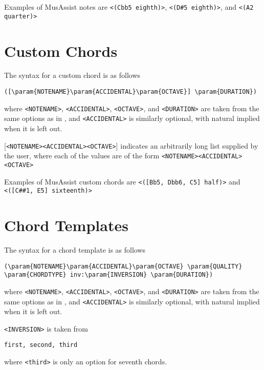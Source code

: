 \documentclass{report}
\newcommand\param[1]{\verb!<#1>!}
\begin{document}
Examples of MusAssist notes are \param{(Cbb5 eighth)}, \param{(D#5 eighth)}, and \param{(A2 quarter)}


\section{Custom Chords}
The syntax for a custom chord is as follows

\begin{verbatim}
([\param{NOTENAME}\param{ACCIDENTAL}\param{OCTAVE}] \param{DURATION})
\end{verbatim}

\noindent where \param{NOTENAME}, \param{ACCIDENTAL}, \param{OCTAVE}, and \param{DURATION} are taken from the same options as in , and \param{ACCIDENTAL} is similarly optional, with natural implied when it is left out.

[\param{NOTENAME}\param{ACCIDENTAL}\param{OCTAVE}] indicates an arbitrarily long list supplied by the user, where each of the values are of the form \param{NOTENAME}\param{ACCIDENTAL}\param{OCTAVE}

Examples of MusAssist custom chords are \param{([Bb5, Dbb6, C5] half)} and  \param{([C##1, E5] sixteenth)}


\section{Chord Templates}
The syntax for a chord template is as follows

\begin{verbatim}
(\param{NOTENAME}\param{ACCIDENTAL}\param{OCTAVE} \param{QUALITY} \param{CHORDTYPE} inv:\param{INVERSION} \param{DURATION})
\end{verbatim}

\noindent where \param{NOTENAME}, \param{ACCIDENTAL}, \param{OCTAVE}, and \param{DURATION} are taken from the same options as in , and \param{ACCIDENTAL} is similarly optional, with natural implied when it is left out.

\param{INVERSION} is taken from 
\begin{verbatim}
first, second, third
\end{verbatim}

\noindent where \param{third} is only an option for seventh chords.
\end{document}
